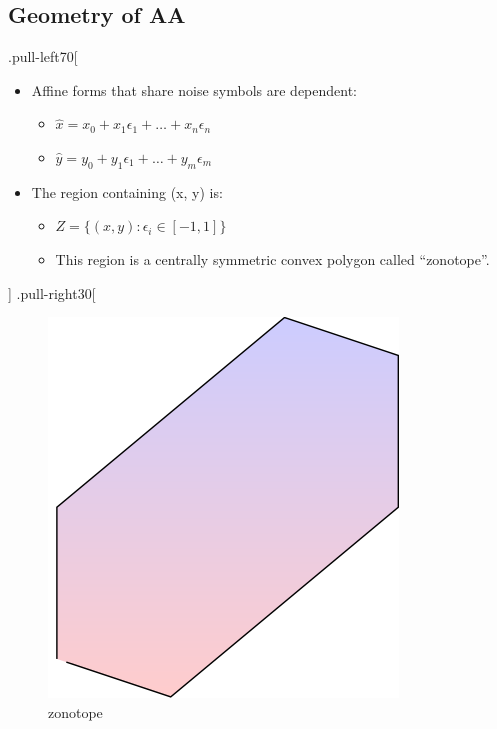 \documentclass[
]{article}
\providecommand{\tightlist}{%
  \setlength{\itemsep}{0pt}\setlength{\parskip}{0pt}}
\begin{document}
\hypertarget{geometry-of-aa}{%
\subsection{Geometry of AA}\label{geometry-of-aa}}

.pull-left70{[}

\begin{itemize}
\tightlist
\item
  Affine forms that share noise symbols are dependent:

  \begin{itemize}
  \tightlist
  \item
    \(\hat{x} = x_0 + x_1 \epsilon_1 + \ldots + x_n \epsilon_n\)
  \item
    \(\hat{y} = y_0 + y_1 \epsilon_1 + \ldots + y_m \epsilon_m\)
  \end{itemize}
\item
  The region containing (x, y) is:

  \begin{itemize}
  \tightlist
  \item
    \(Z = \{(x, y) : \epsilon_i \in [-1, 1]\}\)
  \item
    This region is a centrally symmetric convex polygon called ``zonotope''.
  \end{itemize}
\end{itemize}

{]} .pull-right30{[}

\begin{figure}
\centering
\includegraphics{lec04.files/zonotope.svg}
\caption{zonotope}
\end{figure}
\end{document}

